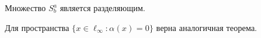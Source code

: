 \begin{corollary}
	Множество $S^a_b$ является разделяющим.
\end{corollary}

\begin{hypothesis}
	Для пространства $\{x\in\ell_\infty : \alpha(x) = 0\}$
	верна аналогичная теорема.
\end{hypothesis}
